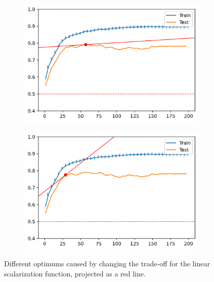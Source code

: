 \begin{figure}[H]
    \centering
    \begin{subfigure}[b]{0.4\linewidth}
        \includegraphics[width=\linewidth]{img/ch4/vanilla200-tradeoff.png}
    \end{subfigure}
    \begin{subfigure}[b]{0.4\linewidth}
        \includegraphics[width=\linewidth]{img/ch4/vanilla200-tradeoffB.png}
    \end{subfigure}
    \caption[Comparison of optimal subset selected by scalarization parameters]{Different optimums caused by changing the trade-off for the linear scalarization function, projected as a red line.}
    \label{fig:ch4.tradeoff}
\end{figure}

